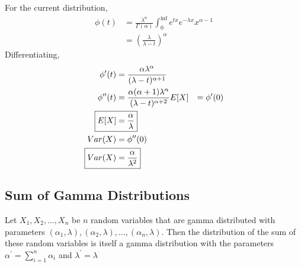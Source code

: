 \documentclass[../probability-notes.tex]{subfiles}
\begin{document}
    For the current distribution,
    \begin{align*}
        \phi(t) &= \frac{\lambda^{\alpha}}{\Gamma(\alpha)} \int_{0}^{\inf} e^{tx} e^{-\lambda x} x^{\alpha - 1}\\
        &= (\frac{\lambda}{\lambda - t})^{\alpha}
    \end{align*}
    Differentiating,
    \begin{align*}
        \phi^{\prime}(t) &= \frac{\alpha \lambda^{\alpha}}{(\lambda - t)^{\alpha + 1}}\\
        \phi^{\prime \prime}(t) &= \frac{\alpha(\alpha + 1)\lambda^{\alpha}}{(\lambda - t)^{\alpha + 2}}
        \newline
        E[X] &= \phi^{\prime}(0)\\
        \Aboxed{E[X] &= \frac{\alpha}{\lambda}}\\
        Var(X) &= \phi^{\prime \prime}(0)\\
        \Aboxed{Var(X) &= \frac{\alpha}{\lambda^{2}}}
    \end{align*}

    \subsection{Sum of Gamma Distributions}
    Let $X_{1}, X_{2}, \ldots, X_{n}$ be $n$ random variables that are gamma distributed with parameters \newline$(\alpha_{1}, \lambda), (\alpha_{2}, \lambda), \ldots, (\alpha_{n}, \lambda)$. Then the distribution of the sum of these random variables is itself a gamma distribution with the parameters $\alpha^{\prime} = \sum_{i=1}^{n} \alpha_{i}$ and $\lambda^{\prime} = \lambda$
\end{document}
